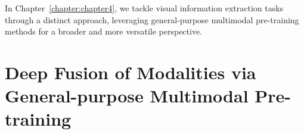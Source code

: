 In Chapter~\ref{chapter:chapter4}, we tackle visual information extraction tasks through a distinct approach, leveraging general-purpose multimodal pre-training methods for a broader and more versatile perspective.





\section{Deep Fusion of Modalities via General-purpose Multimodal Pre-training}
\label{section:deep-fusion}

